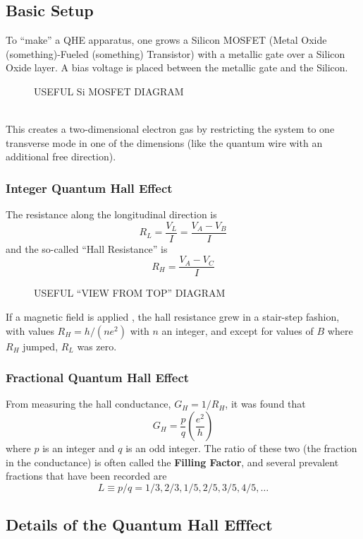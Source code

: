 \documentclass{article}
\begin{document}
	\subsection{Basic Setup}
	To ``make'' a QHE apparatus, one grows a Silicon MOSFET (Metal Oxide (something)-Fueled (something) Transistor) with a metallic gate over a Silicon Oxide layer. A bias voltage is placed between the metallic gate and the Silicon.\\
	\begin{figure}[h]
		\caption{USEFUL Si MOSFET DIAGRAM}
	\end{figure}	\\
	\noindent This creates a two-dimensional electron gas by restricting the system to one transverse mode in one of the dimensions (like the quantum wire with an additional free direction). \\
	
	\subsubsection{Integer Quantum Hall Effect} The resistance along the longitudinal direction is
	$$R_{L}=\frac{V_L}{I}=\frac{V_A-V_B}{I}$$
	and the so-called ``Hall Resistance'' is
	$$R_H=\frac{V_A-V_C}{I}$$
	\begin{figure}[h]
		\caption{USEFUL ``VIEW FROM TOP'' DIAGRAM}
	\end{figure}
If a magnetic field is applied , the hall resistance grew in a stair-step fashion, with values $R_H=h/(ne^2)$ with $n$ an integer, and except for values of $B$ where $R_H$ jumped, $R_L$ was zero.

	\subsubsection{Fractional Quantum Hall Effect}
	From measuring the hall conductance, $G_H=1/R_H$, it was found that
	$$G_H=\frac{p}{q}\left(\frac{e^2}{h}\right)$$
	where $p$ is an integer and $q$ is an odd integer. The ratio of these two (the fraction in the conductance) is often called the \textbf{Filling Factor}, and several prevalent fractions that have been recorded are
	$$L\equiv p/q=1/3, 2/3,1/5,2/5,3/5,4/5,\ldots$$

	\subsection{Details of the Quantum Hall Efffect}
\end{document}
